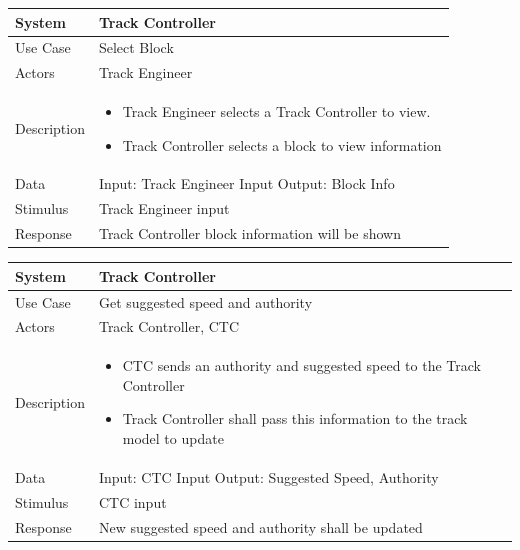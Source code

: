 \documentclass{article}
\begin{document}
    \begin{longtable}{
    || >{\raggedright\arraybackslash}m{}
    | >{\raggedright\arraybackslash}m{}||}
    \hline
    \textbf{System} & \textbf{Track Controller} \\
    \hline
    Use Case & Select Block\\
    \hline
    Actors & Track Engineer\\
    \hline
    Description & \begin{itemize}
        \item Track Engineer selects a Track Controller to view.
        \item Track Controller selects a block to view information
    \end{itemize}\\
    \hline
    Data & Input: Track Engineer Input \newline Output: Block Info\\
    \hline
    Stimulus & Track Engineer input\\
    \hline
    Response & Track Controller block information will be shown\\
    \hline
    \end{longtable}
    \begin{longtable}{
    || >{\raggedright\arraybackslash}m{}
    | >{\raggedright\arraybackslash}m{}||}
    \hline
    \textbf{System} & \textbf{Track Controller} \\
    \hline
    Use Case & Get suggested speed and authority\\
    \hline
    Actors & Track Controller, CTC \\
    \hline
    Description & \begin{itemize}
        \item CTC sends an authority and suggested speed to the Track Controller
        \item Track Controller shall pass this information to the track model to update
    \end{itemize}\\
    \hline
    Data & Input: CTC Input \newline Output: Suggested Speed, Authority\\
    \hline
    Stimulus & CTC input\\
    \hline
    Response & New suggested speed and authority shall be updated\\
    \hline
    \end{longtable}
\end{document}
